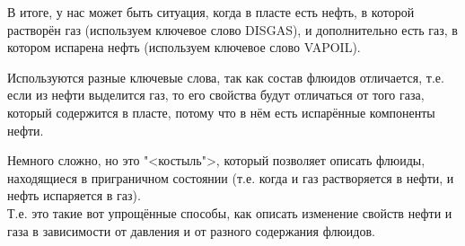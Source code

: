 В итоге, у нас может быть ситуация, когда в пласте есть нефть, в которой растворён газ (используем ключевое слово DISGAS), и дополнительно есть газ, в котором испарена нефть (используем ключевое слово VAPOIL).

Используются разные ключевые слова, так как состав флюидов отличается, т.е. если из нефти выделится газ, то его свойства будут отличаться от того газа, который содержится в пласте, потому что в нём есть испарённые компоненты нефти.

Немного сложно, но это "<костыль">, который позволяет описать флюиды, находящиеся в приграничном состоянии (т.е. когда и газ растворяется в нефти, и нефть испаряется в газ).
\\

Т.е. это такие вот упрощённые способы, как описать изменение свойств нефти и газа в зависимости от давления и от разного содержания флюидов.


